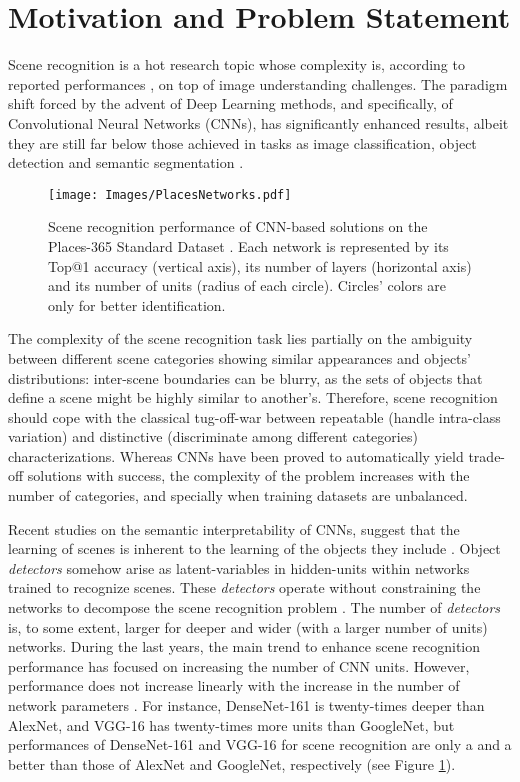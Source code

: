 \documentclass[review, 3p, sort&compress]{elsarticle}
\begin{document}
\section{Motivation and Problem Statement}\label{sec:Problem Motivation}

Scene recognition is a hot research topic whose complexity is, according to reported performances \cite{zhou2018places}, on top of image understanding challenges. The paradigm shift forced by the advent of Deep Learning methods, and specifically, of Convolutional Neural Networks (CNNs), has significantly enhanced results, albeit they are still far below those achieved in tasks as image classification, object detection and semantic segmentation \cite{ILSVRC15ImageNet,zhou2017scene,Cordts2016Cityscapes}.

\begin{figure}[t!]
    \centering
    \texttt{[image: Images/PlacesNetworks.pdf]}
    \caption{Scene recognition performance of CNN-based solutions on the Places-365 Standard Dataset \cite{zhou2018places}. Each network is represented by its Top@1 accuracy (vertical axis), its number of layers (horizontal axis) and its number of units (radius of each circle). Circles' colors are only for better identification.}
    \label{fig:Places Networks}
\end{figure}

The complexity of the scene recognition task lies partially on the ambiguity between different scene categories showing similar appearances and objects' distributions: inter-scene boundaries can be blurry, as the sets of objects that define a scene might be highly similar to another's. Therefore, scene recognition should cope with the classical tug-off-war between repeatable (handle intra-class variation) and distinctive (discriminate among different categories) characterizations. Whereas CNNs have been proved to automatically yield trade-off solutions with success, the complexity of the problem increases with the number of categories, and specially when training datasets are unbalanced.


Recent studies on the semantic interpretability of CNNs, suggest that the learning of scenes is inherent to the learning of the objects they include \cite{bau2017network}. Object \textit{detectors} somehow arise as latent-variables in hidden-units within networks trained to recognize scenes. These \textit{detectors} operate without constraining the networks to decompose the scene recognition problem \cite{zhou2014object}. The number of \textit{detectors} is, to some extent, larger for deeper and wider (with a larger number of units) networks. During the last years, the main trend to enhance scene recognition performance has focused on increasing the number of CNN units. However, performance does not increase linearly with the increase in the number of network parameters \cite{zhou2018places}. For instance, DenseNet-161 is twenty-times deeper than AlexNet, and VGG-16 has twenty-times more units than GoogleNet, but performances of DenseNet-161 and VGG-16 for scene recognition are only a  and a  better than those of AlexNet and GoogleNet, respectively (see Figure \ref{fig:Places Networks}).
\end{document}
